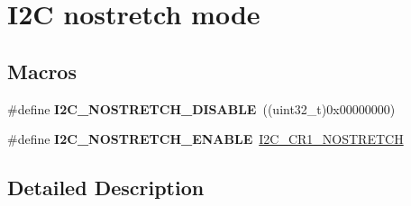 \hypertarget{group___i2_c__nostretch__mode}{\section{I2\-C nostretch mode}
\label{group___i2_c__nostretch__mode}
}
\subsection*{Macros}
\begin{DoxyCompactItemize}
\item 
\hypertarget{group___i2_c__nostretch__mode_ga611deefe89e56fa65f853e6796f2cf66}{\#define {\bfseries I2\-C\-\_\-\-N\-O\-S\-T\-R\-E\-T\-C\-H\-\_\-\-D\-I\-S\-A\-B\-L\-E}~((uint32\-\_\-t)0x00000000)}\label{group___i2_c__nostretch__mode_ga611deefe89e56fa65f853e6796f2cf66}

\item 
\hypertarget{group___i2_c__nostretch__mode_ga67ebace1182d99bb5d7968994c01c80e}{\#define {\bfseries I2\-C\-\_\-\-N\-O\-S\-T\-R\-E\-T\-C\-H\-\_\-\-E\-N\-A\-B\-L\-E}~\hyperlink{group___peripheral___registers___bits___definition_ga197aaca79f64e832af3a0a0864c2a08c}{I2\-C\-\_\-\-C\-R1\-\_\-\-N\-O\-S\-T\-R\-E\-T\-C\-H}}\label{group___i2_c__nostretch__mode_ga67ebace1182d99bb5d7968994c01c80e}

\end{DoxyCompactItemize}


\subsection{Detailed Description}
